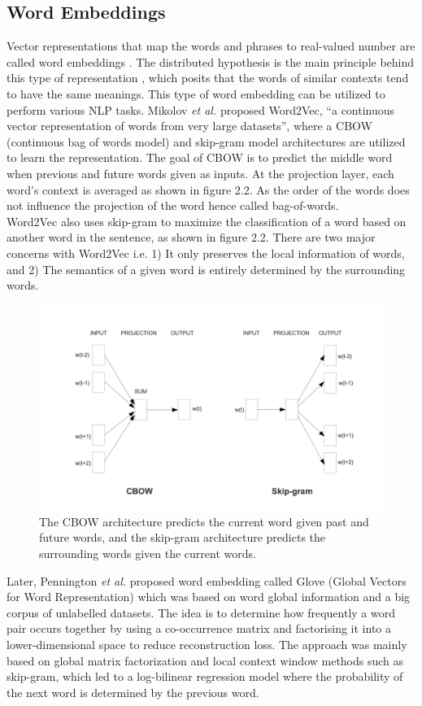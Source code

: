 \documentclass[%
	BCOR=8mm, %
	DIV=12,
	toc=bibliography, %
	toc=listof, %
	oneside, %
	egregdoesnotlikesansseriftitles, %
	]{scrbook}
\begin{document}
\subsection{Word Embeddings}
\label{subsection:wordembeddings}
Vector representations that map the words and phrases to real-valued number are called word embeddings \cite{almeida_word_2019-2}. The distributed hypothesis is the main principle behind this type of representation \cite{harris_distributional_1954}, which posits that the words of similar contexts tend to have the same meanings. This type of word embedding can be utilized to perform various NLP tasks. Mikolov \textit{et al.} \cite{mikolov_efficient_2013} proposed Word2Vec, ``a continuous vector representation of words from very large datasets'', where a CBOW (continuous bag of words model) and skip-gram model architectures are utilized to learn the representation. The goal of CBOW is to predict the middle word when previous and future words given as inputs. At the projection layer, each word's context is averaged as shown in figure 2.2. As the order of the words does not influence the projection of the word hence called bag-of-words. \\
Word2Vec also uses skip-gram to maximize the classification of a word based on another word in the  sentence, as shown in figure 2.2.  There are two major concerns with Word2Vec i.e. 1) It only preserves the local information of words,  and 2) The semantics of a given word is entirely determined by the surrounding words.
\begin{figure}[h!]
    \centering
    \includegraphics[width=0.7\linewidth]{img/cbowandskip.png}
    \caption[Working diagram of CBOW and Skip-gram.]{ The CBOW architecture predicts the current word given past and future words, and the skip-gram architecture predicts the surrounding words given the current words.}
    \label{fig:cbow}
\end{figure}
Later, Pennington \textit{et al.} \cite{pennington_glove_2014} proposed word embedding called Glove (Global Vectors for Word Representation) which was based on word global information and a big corpus of unlabelled datasets. The idea is to determine how frequently a word pair occurs together by using a co-occurrence matrix and factorising it into a lower-dimensional space to reduce reconstruction loss. The approach was mainly based on global matrix factorization and local context window methods such as skip-gram, which led to a log-bilinear regression model where the probability of the next word is determined by the previous word.\\
\end{document}
